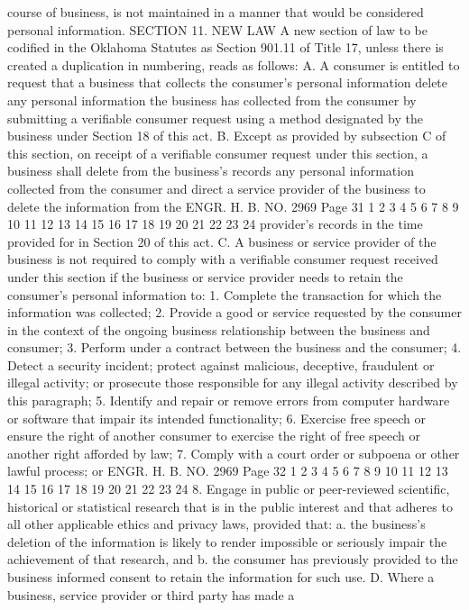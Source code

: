 course of business, is not maintained in a manner that would be
considered personal information.
SECTION 11. NEW LAW A new section of law to be codified
in the Oklahoma Statutes as Section 901.11 of Title 17, unless there
is created a duplication in numbering, reads as follows:
A. A consumer is entitled to request that a business that
collects the consumer's personal information delete any personal
information the business has collected from the consumer by
submitting a verifiable consumer request using a method designated
by the business under Section 18 of this act.
B. Except as provided by subsection C of this section, on
receipt of a verifiable consumer request under this section, a
business shall delete from the business's records any personal
information collected from the consumer and direct a service
provider of the business to delete the information from the 
ENGR. H. B. NO. 2969 Page 31
1
2
3
4
5
6
7
8
9
10
11
12
13
14
15
16
17
18
19
20
21
22
23
24
provider's records in the time provided for in Section 20 of this
act.
C. A business or service provider of the business is not
required to comply with a verifiable consumer request received under
this section if the business or service provider needs to retain the
consumer's personal information to:
1. Complete the transaction for which the information was
collected;
2. Provide a good or service requested by the consumer in the
context of the ongoing business relationship between the business
and consumer;
3. Perform under a contract between the business and the
consumer;
4. Detect a security incident; protect against malicious,
deceptive, fraudulent or illegal activity; or prosecute those
responsible for any illegal activity described by this paragraph;
5. Identify and repair or remove errors from computer hardware
or software that impair its intended functionality;
6. Exercise free speech or ensure the right of another consumer
to exercise the right of free speech or another right afforded by
law;
7. Comply with a court order or subpoena or other lawful
process; or
ENGR. H. B. NO. 2969 Page 32
1
2
3
4
5
6
7
8
9
10
11
12
13
14
15
16
17
18
19
20
21
22
23
24
8. Engage in public or peer-reviewed scientific, historical or
statistical research that is in the public interest and that adheres
to all other applicable ethics and privacy laws, provided that:
a. the business's deletion of the information is likely
to render impossible or seriously impair the
achievement of that research, and
b. the consumer has previously provided to the business
informed consent to retain the information for such
use.
D. Where a business, service provider or third party has made a
